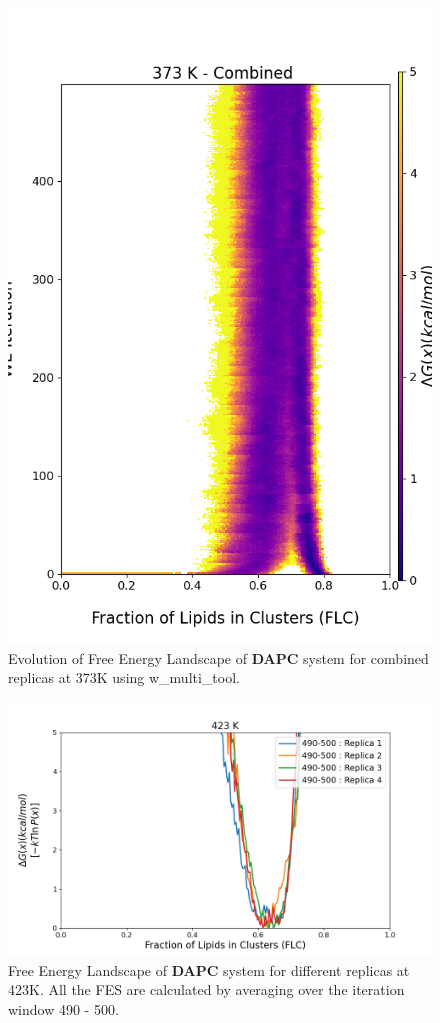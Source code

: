 \documentclass{biophys-new}
\begin{document}
\begin{figure}[hbt!]
\centering
\includegraphics[width=0.8\linewidth]{all_plots/ClusterLipids2Total/DPPC_DAPC_CHOL/373K/Evolution_DAPC_MULTI__373_ClusterLipids2Total.png}
\caption{Evolution of Free Energy Landscape of \textbf{DAPC} system for combined replicas at 373K using w\_multi\_tool.}
\label{fig:view}

\end{figure}


\begin{figure}[hbt!]
\centering
\includegraphics[width=1.1\linewidth]{all_plots/ClusterLipids2Total/DPPC_DAPC_CHOL/423K/Average_DAPC_423_ClusterLipids2Total.png}
\caption{Free Energy Landscape of \textbf{DAPC} system for different replicas at 423K. All the FES are calculated by averaging over the iteration window 490 - 500.}
\label{fig:view}

\end{figure}
\end{document}
